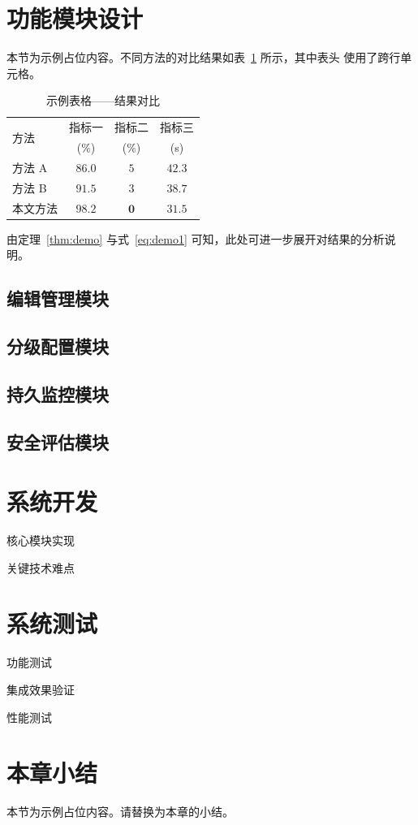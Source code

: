 \section{功能模块设计}
本节为示例占位内容。不同方法的对比结果如表~\ref{tab:results} 所示，其中表头
使用了跨行单元格。

\begin{table}[htbp]
  \centering
  \caption{示例表格——结果对比}
  \label{tab:results}
  \begin{tabular}{lccc}
    \toprule
    \multirow{2}{*}{方法} & 指标一 & 指标二 & 指标三 \\
                          & (\%)   & (\%)   & (s)    \\
    \midrule
    方法 A     & $86.0$ & $5$ & $42.3$ \\
    方法 B     & $91.5$ & $3$ & $38.7$ \\
    本文方法   & $\mathbf{98.2}$ & $\mathbf{0}$ & $\mathbf{31.5}$ \\
    \bottomrule
  \end{tabular}
\end{table}

由定理~\ref{thm:demo} 与式~\eqref{eq:demo1} 可知，此处可进一步展开对结果的分析说明。

\subsection{编辑管理模块}

\subsection{分级配置模块}

\subsection{持久监控模块}

\subsection{安全评估模块}

\section{系统开发}

核心模块实现

关键技术难点

\section{系统测试}

功能测试

集成效果验证

性能测试

\section{本章小结}
本节为示例占位内容。请替换为本章的小结。
